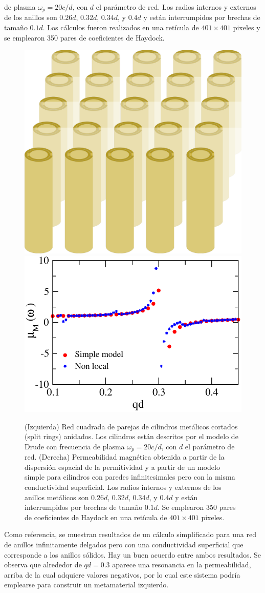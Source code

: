 \documentclass[12pt]{article}
\begin{document}
de plasma $\omega_p=20c/d$, con $d$ el parámetro de red. Los radios
internos y externos de los anillos son $0.26d$, $0.32d$, $0.34d$, y
$0.4d$ y están interrumpidos por brechas de tamaño $0.1d$. Los
cálculos fueron realizados en una retícula de $401\times401$ pixeles y
se emplearon 350 pares de coeficientes de Haydock.
\begin{figure}
  \centering
  \includegraphics[width=.34\textwidth]{fig17a}
  \includegraphics[width=.55\textwidth]{fig17b}
  \caption{(Izquierda) Red cuadrada de parejas de cilindros metálicos cortados
    (split rings) anidados. Los cilindros están descritos por el
    modelo de Drude con frecuencia de plasma $\omega_p=20c/d$, con $d$
    el parámetro de red. (Derecha) Permeabilidad magnética obtenida
    a partir de la dispersión espacial de la permitividad y a partir de
    un modelo simple para cilindros con paredes infinitesimales pero con
    la misma conductividad superficial. Los radios internos y externos
    de los anillos metálicos son $0.26d$, $0.32d$, $0.34d$, y
    $0.4d$ y están interrumpidos por brechas de tamaño $0.1d$. Se
    emplearon 350 pares de coeficientes de Haydock en una retícula de
    $401\times401$ pixeles. }
  \label{fig:mu}
\end{figure}
Como referencia, se muestran resultados de un cálculo simplificado
para una red de anillos infinitamente delgados pero con una
conductividad superficial que corresponde a los anillos sólidos. Hay
un buen acuerdo entre ambos resultados. Se
observa que alrededor de $qd=0.3$ aparece una resonancia en la
permeabilidad, arriba de la cual adquiere valores negativos, por lo
cual este sistema podría emplearse para construir un metamaterial
izquierdo.
\end{document}

